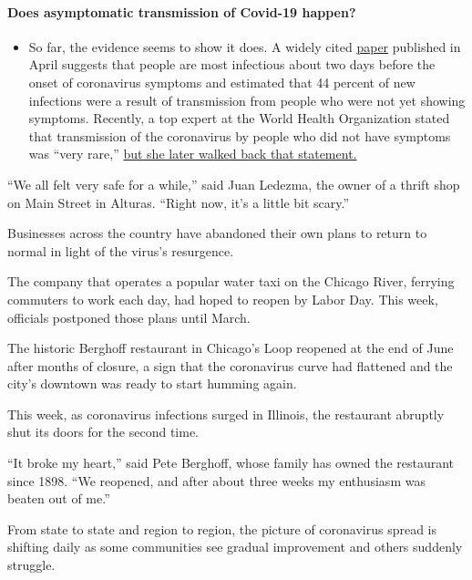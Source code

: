 \begin{itemize}
{  \paragraph{Does asymptomatic transmission of Covid-19
  happen?}\label{does-asymptomatic-transmission-of-covid-19-happen}}

  \begin{itemize}
  \tightlist
  \item
    So far, the evidence seems to show it does. A widely cited
    \href{https://www.nature.com/articles/s41591-020-0869-5}{paper}
    published in April suggests that people are most infectious about
    two days before the onset of coronavirus symptoms and estimated that
    44 percent of new infections were a result of transmission from
    people who were not yet showing symptoms. Recently, a top expert at
    the World Health Organization stated that transmission of the
    coronavirus by people who did not have symptoms was ``very rare,''
    \href{https://www.nytimes.com/2020/06/09/world/coronavirus-updates.html?action=click\&pgtype=Article\&state=default\&region=MAIN_CONTENT_3\&context=storylines_faq\#link-1f302e21}{but
    she later walked back that statement.}
  \end{itemize}
\end{itemize}

``We all felt very safe for a while,'' said Juan Ledezma, the owner of a
thrift shop on Main Street in Alturas. ``Right now, it's a little bit
scary.''

Businesses across the country have abandoned their own plans to return
to normal in light of the virus's resurgence.

The company that operates a popular water taxi on the Chicago River,
ferrying commuters to work each day, had hoped to reopen by Labor Day.
This week, officials postponed those plans until March.

The historic Berghoff restaurant in Chicago's Loop reopened at the end
of June after months of closure, a sign that the coronavirus curve had
flattened and the city's downtown was ready to start humming again.

This week, as coronavirus infections surged in Illinois, the restaurant
abruptly shut its doors for the second time.

``It broke my heart,'' said Pete Berghoff, whose family has owned the
restaurant since 1898. ``We reopened, and after about three weeks my
enthusiasm was beaten out of me.''

From state to state and region to region, the picture of coronavirus
spread is shifting daily as some communities see gradual improvement and
others suddenly struggle.

